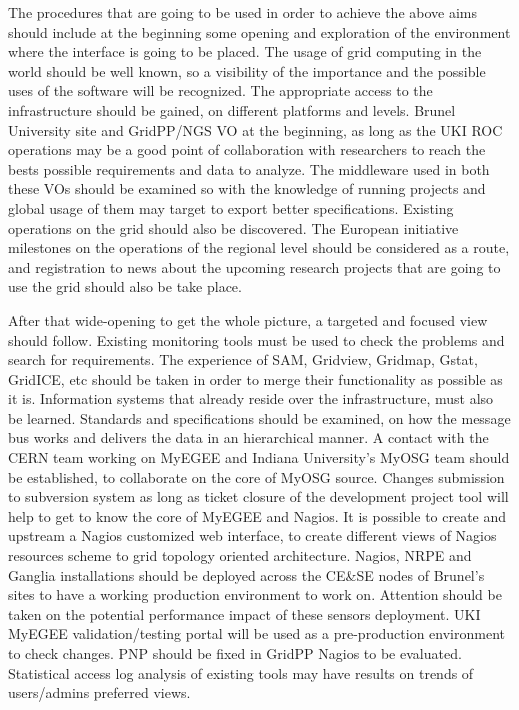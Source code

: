 The procedures that are going to be used in order to achieve the above aims should include at the beginning some opening and exploration of the environment where the interface is going to be placed. The usage of grid computing in the world should be well known, so a visibility of the importance and the possible uses of the software will be recognized. The appropriate access to the infrastructure should be gained, on different platforms and levels. Brunel University site and GridPP/NGS VO at the beginning, as long as the UKI ROC operations may be a good point of collaboration with researchers to reach the bests possible requirements and data to analyze. The middleware used in both these VOs should be examined so with the knowledge of running projects and global usage of them may target to export better specifications. Existing operations on the grid should also be discovered. The European initiative milestones on the operations of the regional level should be considered as a route, and registration to news about the upcoming research projects that are going to use the grid should also be take place.

After that wide-opening to get the whole picture, a targeted and focused view should follow. Existing monitoring tools must be used to check the problems and search for requirements. The experience of SAM, Gridview, Gridmap, Gstat, GridICE, etc should be taken in order to merge their functionality as possible as it is. Information systems that already reside over the infrastructure, must also be learned. Standards and specifications should be examined, on how the message bus works and delivers the data in an hierarchical manner. A contact with the CERN team working on MyEGEE and Indiana University's MyOSG team should be established, to collaborate on the core of MyOSG source. Changes submission to subversion system as long as ticket closure of the development project tool will help to get to know the core of MyEGEE and Nagios. It is possible to create and upstream a Nagios customized web interface, to create different views of Nagios resources scheme to grid topology oriented architecture. Nagios, NRPE and Ganglia installations should be deployed across the CE\&SE nodes of Brunel's sites to have a working production environment to work on. Attention should be taken on the potential performance impact of these sensors deployment. UKI MyEGEE validation/testing portal will be used as a pre-production environment to check changes. PNP should be fixed in GridPP Nagios to be evaluated. Statistical access log analysis of existing tools may have results on trends of users/admins preferred views.

